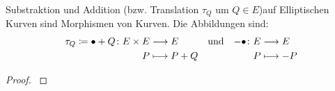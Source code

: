 \begin{Satz}\label{additionmorphismus}
  Substraktion und Addition (bzw. Translation $\tau_Q$ um $Q\in E$)auf
  Elliptischen Kurven sind Morphismen von Kurven. Die Abbildungen sind:
  \begin{align*}
    \tau_Q\coloneqq\bullet+Q\colon E\times E&\longrightarrow E  
    &&\text{und}  
    &-\bullet\colon E&\longrightarrow E \\
    P&\longmapsto P+Q             
    &&&P&\longmapsto -P
  \end{align*}
  \begin{proof}
    \cite[siehe][Theorem 3.6]{silverman}
  \end{proof}
\end{Satz}

